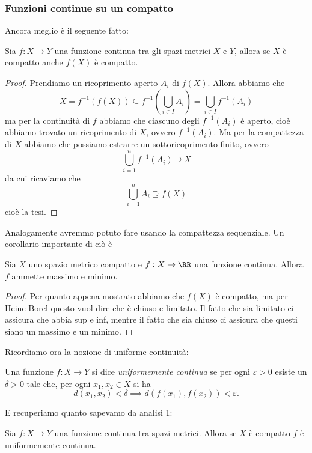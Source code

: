 \documentclass[11pt]{scrartcl}
\begin{document}
	\subsubsection{Funzioni continue su un compatto}
	Ancora meglio è il seguente fatto:
	\begin{theorem}
		Sia $f:X\to Y$ una funzione continua tra gli spazi metrici $X$ e $Y$, allora se $X$ è compatto anche $f(X)$ è compatto.
	\end{theorem}
	\begin{proof}
		Prendiamo un ricoprimento aperto $A_i$ di $f(X)$. Allora abbiamo che
		$$X=f^{-1}\left(f(X)\right)\subseteq f^{-1}\left(\bigcup_{i\in I}A_i\right)=\bigcup_{i\in I}f^{-1}(A_i)$$
		ma per la continuità di $f$ abbiamo che ciascuno degli $f^{-1}(A_i)$ è aperto, cioè abbiamo trovato un ricoprimento di $X$, ovvero $f^{-1}(A_i)$. Ma per la compattezza di $X$ abbiamo che possiamo estrarre un sottoricoprimento finito, ovvero
		$$\bigcup_{i=1}^n f^{-1}(A_i)\supseteq X$$
		da cui ricaviamo che 
		$$\bigcup_{i=1}^n A_i \supseteq f(X)$$
		cioè la tesi.
	\end{proof}
	Analogamente avremmo potuto fare usando la compattezza sequenziale. Un corollario importante di ciò è
	\begin{corollary}[Weierstrass]
		Sia $X$ uno spazio metrico compatto e $f:X\to\RR$ una funzione continua. Allora $f$ ammette massimo e minimo.
	\end{corollary}
	\begin{proof}
		Per quanto appena mostrato abbiamo che $f(X)$ è compatto, ma per Heine-Borel questo vuol dire che è chiuso e limitato. Il fatto che sia limitato ci assicura che abbia sup e inf, mentre il fatto che sia chiuso ci assicura che questi siano un massimo e un minimo.
	\end{proof}
	Ricordiamo ora la nozione di uniforme continuità:
	\begin{definition}
		Una funzione $f:X\to Y$ si dice \textit{uniformemente continua} se per ogni $\varepsilon>0$ esiste un $\delta>0$ tale che, per ogni $x_1,x_2\in X$ si ha 
		$$d(x_1,x_2)<\delta \implies d(f(x_1),f(x_2))<\varepsilon.$$
	\end{definition}
	E recuperiamo quanto sapevamo da analisi 1:
	\begin{theorem}
		Sia $f:X\to Y$ una funzione continua tra spazi metrici. Allora se $X$ è compatto $f$ è uniformemente continua.
	\end{theorem}
\end{document}
